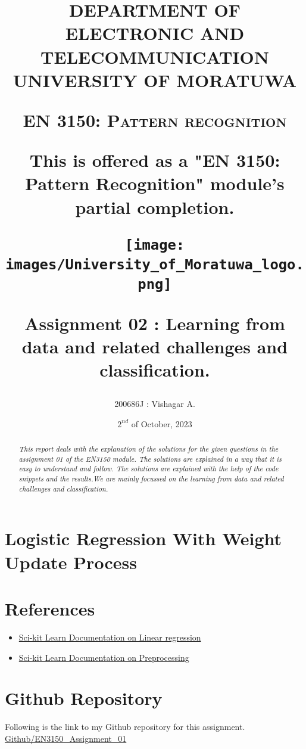 \documentclass[11pt,a4paper]{article}
\title{DEPARTMENT OF ELECTRONIC AND TELECOMMUNICATION
UNIVERSITY OF MORATUWA

\vspace{10pt}

{\large{\textsc{EN 3150: Pattern recognition}}}

{\textsf{This is offered as a "EN 3150: Pattern Recognition" module's partial completion.}}

\vspace{30pt}
\texttt{[image: images/University\_of\_Moratuwa\_logo.png]}

{\textsf{\textbf{Assignment 02 : Learning from data and related
challenges and classification.}}}}
\author{200686J : Vishagar A.}
\date{$2^{nd}$ of October, 2023}
\begin{document}
\maketitle

\newpage

\begin{abstract}
    \textit{This report deals with the explanation of the solutions for the given questions in the assignment 01 of the EN3150 module. The solutions are explained in a way that it is easy to understand and follow. The solutions are explained with the help of the code snippets and the results.We are mainly focussed on the learning from data and related challenges and classification.}    
\end{abstract}    

\vspace{50pt}
\tableofcontents


\newpage

\twocolumn

\section{Logistic Regression With Weight Update Process}





% 




\section{References}

\begin{itemize}
    \item \href{https://scikit-learn.org/stable/modules/generated/sklearn.linear_model.LinearRegression.html}{Sci-kit Learn Documentation on Linear regression}
    \item \href{https://scikit-learn.org/stable/modules/preprocessing.html}{Sci-kit Learn Documentation on Preprocessing}
   
\end{itemize}

\section{Github Repository}

Following is the link to my Github repository for this assignment.\\

\href{https://github.com/Vgr20/EN3150_Assignment_01.git }{Github/EN3150\_Assignment\_01}
\end{document}

